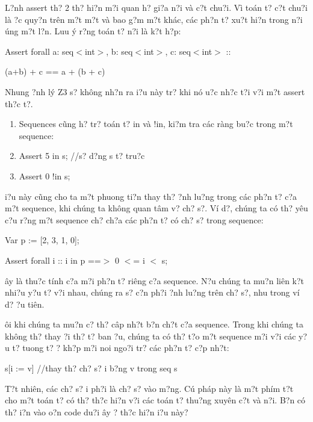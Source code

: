 \documentclass{article} %
\begin{document}
L?nh assert th? 2 th? hi?n m?i quan h? gi?a n?i v\`{a} c?t chu?i. V\`{i} to\'{a}n t? c?t chu?i l\`{a} {\dj}?c quy?n tr\^{e}n m?t m?t v\`{a} bao g?m m?t kh\'{a}c, c\'{a}c ph?n t? xu?t hi?n trong n?i {\dj}\'{u}ng m?t l?n. Luu \'{y} r?ng to\'{a}n t? n?i l\`{a} k?t h?p: 

Assert forall a: seq$<$int$>$, b: seq$<$int$>$, c: seq$<$int$>$ :: 

(a+b) + c == a + (b + c)

\noindent Nhung {\dj}?nh l\'{y} Z3 s? kh\^{o}ng nh?n ra {\dj}i?u n\`{a}y tr? khi n\'{o} {\dj}u?c nh?c t?i v?i m?t assert th?c t?.

\begin{enumerate}
\item  Sequences c\~{u}ng h? tr? to\'{a}n t? in v\`{a} !in,  ki?m tra c\'{a}c r\`{a}ng bu?c trong m?t sequence:

\item  Assert 5 in s; //s? d?ng s t? tru?c

\item  Assert 0 !in s;
\end{enumerate}

\noindent {\DJ}i?u n\`{a}y c\~{u}ng cho ta m?t phuong ti?n thay th? {\dj}?nh lu?ng trong c\'{a}c ph?n t? c?a m?t sequence, khi ch\'{u}ng ta kh\^{o}ng quan t\^{a}m v? ch? s?. V\'{i} d?, ch\'{u}ng ta c\'{o} th? y\^{e}u c?u r?ng m?t sequence ch? ch?a c\'{a}c ph?n t? c\'{o} ch? s? trong sequence:

Var p := [2, 3, 1, 0];

Assert forall i :: i in p ==$>$ 0 $<$= i $<$ {\textbar}s{\textbar};

{\DJ}\^{a}y l\`{a} thu?c t\'{i}nh c?a m?i ph?n t? ri\^{e}ng c?a sequence. N?u ch\'{u}ng ta mu?n li\^{e}n k?t nhi?u y?u t? v?i nhau, ch\'{u}ng ra s? c?n ph?i {\dj}?nh lu?ng tr\^{e}n ch? s?, nhu trong v\'{i} d? {\dj}?u ti\^{e}n.

{\DJ}\^{o}i khi ch\'{u}ng ta mu?n c? th? c\^{a}p nh?t b?n ch?t c?a sequence. Trong khi ch\'{u}ng ta kh\^{o}ng th? thay {\dj}?i th? t? ban {\dj}?u, ch\'{u}ng ta c\'{o} th? t?o m?t sequence m?i v?i c\'{a}c y?u t?  tuong t? ? kh?p m?i noi ngo?i tr? c\'{a}c ph?n t? c?p nh?t:

s[i := v] //thay th? ch? s? i b?ng v trong seq s

T?t nhi\^{e}n, c\'{a}c ch? s? i ph?i l\`{a} ch? s? v\`{a}o m?ng. C\'{u} ph\'{a}p n\`{a}y l\`{a} m?t ph\'{i}m t?t cho m?t to\'{a}n t? c\'{o} th? th?c hi?n v?i c\'{a}c to\'{a}n t? thu?ng xuy\^{e}n c?t v\`{a} n?i. B?n c\'{o} th? {\dj}i?n v\`{a}o {\dj}o?n code du?i {\dj}\^{a}y {\dj}? th?c hi?n {\dj}i?u n\`{a}y?
\end{document}
